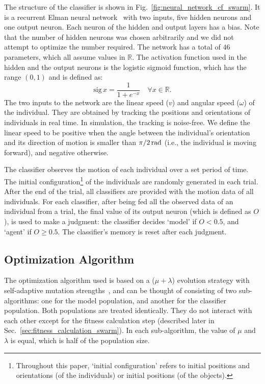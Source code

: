 The structure of the classifier is shown in Fig.~\ref{fig:neural_network_cf_swarm}. It is a recurrent Elman neural network~\cite{Elman1990} with two inputs, five hidden neurons and one output neuron. Each neuron of the hidden and output layers has a bias. Note that the number of hidden neurons was chosen arbitrarily and we did not attempt to optimize the number required. The network has a total of $46$ parameters, which all assume values in $\mathbb{R}$. The activation function used in the hidden and the output neurons is the logistic sigmoid function, which has the range $\left(0,1\right)$ and is defined as: 
%
\begin{equation}\label{equ:logistic_sigmoid}
\textrm{sig}\,x = \frac{1}{1+e^{-x}}\quad\forall x \in \mathbb{R}.
\end{equation}
%
The two inputs to the network are the linear speed ($v$) and angular speed ($\omega$) of the individual. They are obtained by tracking the positions and orientations of individuals in real time. In simulation, the tracking is noise-free. We define the linear speed to be positive when the angle between the individual's orientation and its direction of motion is smaller than $\unit[\pi \small/ 2]{rad}$ (i.e., the individual is moving forward), and negative otherwise. 

The classifier observes the motion of each individual over a set period of time. The initial configuration\footnote{Throughout this paper, `initial configuration' refers to initial positions and orientations (of the individuals) or initial positions (of the objects).} of the individuals are randomly generated in each trial. After the end of the trial, all classifiers are provided with the motion data of all individuals. For each classifier, after being fed all the observed data of an individual from a trial, the final value of its output neuron (which is defined as $O$), is used to make a judgment: the classifier decides `model' if $O<0.5$, and `agent' if $O\geq0.5$. The classifier's memory is reset after each judgment.

\subsection{Optimization Algorithm}\label{sec:optimization_algorithm_swarm}
The optimization algorithm used is based on a ($\mu+\lambda$) evolution strategy with self-adaptive mutation strengths~\cite{Beyer2001, Beyer2002, Eiben2003}, and can be thought of consisting of two sub-algorithms: one for the model population, and another for the classifier population. Both populations are treated identically. They do not interact with each other except for the fitness calculation step (described later in Sec.~\ref{sec:fitness_calculation_swarm}). In each sub-algorithm, the value of $\mu$ and $\lambda$ is equal, which is half of the population size. 

